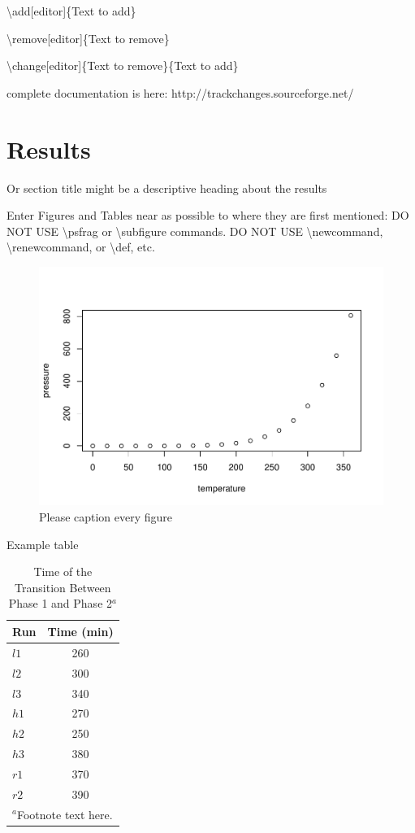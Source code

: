 \documentclass[draft,linenumbers]{agujournal2018}
\begin{document}
\textbackslash add{[}editor{]}\{Text to add\}

\textbackslash remove{[}editor{]}\{Text to remove\}

\textbackslash change{[}editor{]}\{Text to remove\}\{Text to add\}

complete documentation is here: http://trackchanges.sourceforge.net/

\section{Results}

Or section title might be a descriptive heading about the results

Enter Figures and Tables near as possible to where they are first
mentioned: DO NOT USE \textbackslash psfrag or \textbackslash subfigure
commands. DO NOT USE \textbackslash newcommand,
\textbackslash renewcommand, or \textbackslash def, etc.

\begin{figure}[h]
\includegraphics{AGU_files/figure-latex/unnamed-chunk-2-1} \caption{Please caption every figure}\label{fig:unnamed-chunk-2}
\end{figure}

Example table

\begin{table}
 \caption{Time of the Transition Between Phase 1 and Phase 2$^{a}$}
 \centering
 \begin{tabular}{l c}
 \hline
  Run  & Time (min)  \\
 \hline
   $l1$  & 260   \\
   $l2$  & 300   \\
   $l3$  & 340   \\
   $h1$  & 270   \\
   $h2$  & 250   \\
   $h3$  & 380   \\
   $r1$  & 370   \\
   $r2$  & 390   \\
 \hline
 \multicolumn{2}{l}{$^{a}$Footnote text here.}
 \end{tabular}
 \end{table}
\end{document}
